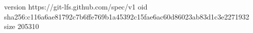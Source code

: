 version https://git-lfs.github.com/spec/v1
oid sha256:c116a6ae81792c7b6ffe769b1a45392c15fae6ac60d86023ab83d1c3e2271932
size 205310
